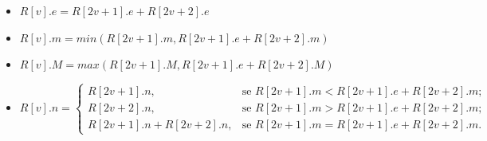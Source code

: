     \begin{itemize}
        \item $R[v].e = R[2v +1 ].e + R[2v + 2].e$
        \item $R[v].m = min(R[2v+1].m, R[2v+1].e + R[2v + 2].m)$
        \item $R[v].M = max(R[2v+1].M, R[2v+1].e + R[2v + 2].M)$
        \item $ R[v].n =
           \begin{cases}
                 R[2v+1].n, & \mbox{se } R[2v+1].m < R[2v+1].e + R[2v + 2].m; \\
                 R[2v + 2].n, & \mbox{se } R[2v+1].m > R[2v+1].e + R[2v + 2].m; \\
                 R[2v+1].n + R[2v + 2].n, & \mbox{se }  R[2v+1].m = R[2v+1].e + R[2v + 2].m .
           \end{cases}
        $
    \end{itemize}

